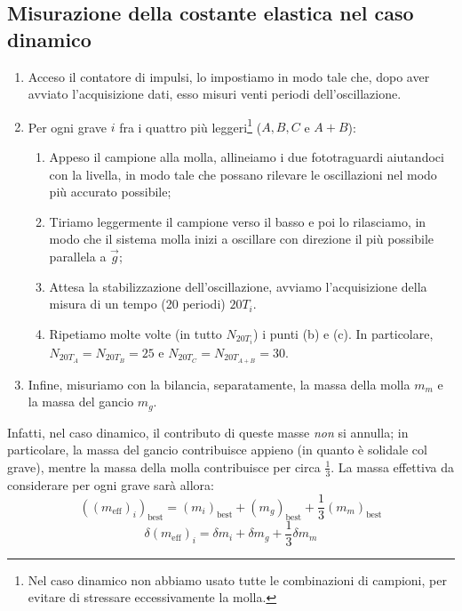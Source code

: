 \documentclass{article}
\newcommand*{\best}[1]{{#1}_\text{best}}
\begin{document}
\subsection{Misurazione della costante elastica nel caso dinamico}
\begin{enumerate}
    \item Acceso il contatore di impulsi, lo impostiamo in modo tale che,
          dopo aver avviato l'acquisizione dati, esso misuri venti periodi
          dell'oscillazione.
    \item Per ogni grave $i$ fra i quattro più leggeri\footnote[1]{
        Nel caso dinamico non abbiamo usato tutte le combinazioni di campioni,
        per evitare di stressare eccessivamente la molla.
    } ($A, B, C$ e $A+B$):
    \begin{enumerate}
        \item Appeso il campione alla molla, allineiamo i due fototraguardi
              aiutandoci con la livella, in modo tale che possano rilevare
              le oscillazioni nel modo più accurato possibile;
        \item Tiriamo leggermente il campione verso il basso e poi lo rilasciamo,
              in modo che il sistema molla inizi a oscillare con direzione
              il più possibile parallela a $\vec{g}$;
        \item Attesa la stabilizzazione dell’oscillazione, avviamo
              l'acquisizione della misura di un tempo (20 periodi)
              $20T_i$.
        \item Ripetiamo molte volte (in tutto $N_{20T_i}$) i punti
              (b) e (c). In particolare, $N_{20T_A} = N_{20T_B} = 25$
              e $N_{20T_C} = N_{20T_{A+B}} = 30$.
    \end{enumerate}
    \item Infine, misuriamo con la bilancia, separatamente,
          la massa della molla $m_m$ e la massa del gancio $m_g$.
\end{enumerate}

Infatti, nel caso dinamico, il contributo di queste masse
\emph{non} si annulla; in particolare, la massa del gancio
contribuisce appieno (in quanto è solidale col grave),
mentre la massa della molla contribuisce per circa
$\frac{1}{3}$. La massa effettiva da considerare per ogni grave
sarà allora:
\[\best{\left(\left(m_\text{eff}\right)_i\right)} = \best{\left(m_i\right)} + \best{\left(m_g\right)} + \frac{1}{3}\best{\left(m_m\right)}\]
\[\delta \left(m_\text{eff}\right)_i = \delta m_i + \delta m_g + \frac{1}{3}\delta m_m\]
\end{document}
